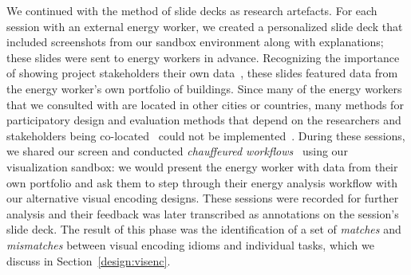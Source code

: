 \documentclass[journal]{vgtc}                %
\newcommand{\bstart}[1]{\vspace{1mm} \noindent{\textbf{#1:}}}
\newcommand{\tm}[1]{\textcolor{red}{#1}}
\begin{document}
We continued with the method of slide decks as research artefacts. 
For each session with an external energy worker, we created a personalized slide deck that included screenshots from our sandbox environment along with explanations; these slides were sent to energy workers in advance.
Recognizing the importance of showing project stakeholders their own data~\cite{Lloyd2011}, these slides featured data from the energy worker's own portfolio of buildings.
Since many of the energy workers that we consulted with are located in other cities or countries, many methods for participatory design and evaluation methods that depend on the researchers and stakeholders being co-located~\cite{Goodwin2013,McKenna2014} could not be implemented~\cite{Brehmer2014a}.
During these sessions, we shared our screen and conducted {\it chauffeured workflows}~\cite{Lloyd2011} using our visualization sandbox: we would present the energy worker with data from their own portfolio and ask them to step through their energy analysis workflow with our alternative visual encoding designs.
These sessions were recorded for further analysis and their feedback was later transcribed as annotations on the session's slide deck.
The result of this phase was the identification of a set of {\it matches} and {\it mismatches} between visual encoding idioms and individual tasks, which we discuss in Section~\ref{design:visenc}. 

\end{document}
